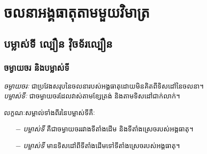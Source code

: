 \chapter{ចលនាអង្គធាតុតាមមួយវិមាត្រ}
\section{បម្លាស់ទី ល្បឿន វុិចទ័រល្បឿន}
\subsection{ចម្ងាយចរ និងបម្លាស់ទី}
\begin{definition}
	\emph{\kml ចម្ងាយចរៈ} ជាប្រវែងសរុបនៃចលនារបស់អង្គធាតុដោយមិនគិតពីទិសដៅនៃចលនា។\\
	\emph{\kml បម្លាស់ទីៈ} ជាចម្ងាយចរដែលវាស់តាមខ្សែត្រង់ និងតាមទិសដៅជាក់លាក់។
\end{definition}
\begin{remark}
	លក្ខណៈសម្គាល់ទាំងពីរនៃបម្លាស់ទីគឺៈ
	\begin{itemize}
		\item [$-$] \emph{បម្លាស់ទី} គឺជាចម្ងាយចររវាងទីតាំងដើម និងទីតាំងស្រេចរបស់អង្គធាតុ។
		\item [$-$] \emph{បម្លាស់ទី} មានទិសដៅពីទីតាំងដើម​ទៅទីតាំងស្រេចរបស់អង្គធាតុ។
	\end{itemize}
\end{remark}
